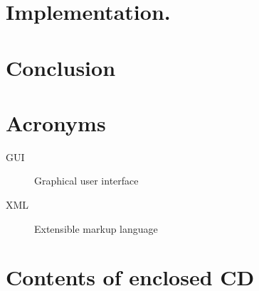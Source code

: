 \documentclass[thesis=M,english]{FITthesis}[2011/07/15]
\begin{document}
\chapter{Implementation.}


\chapter{Conclusion}





\appendix

\chapter{Acronyms}
\begin{description}
	\item[GUI] Graphical user interface
	\item[XML] Extensible markup language
\end{description}


\chapter{Contents of enclosed CD}
\end{document}
